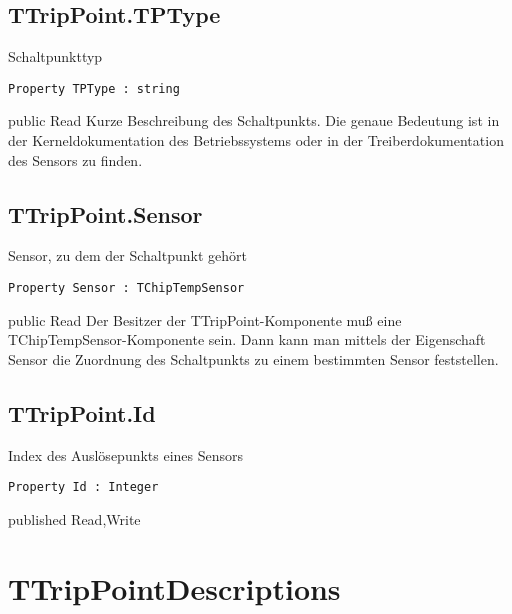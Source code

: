 \subsection{TTripPoint.TPType}
\label{computer:chiptemp:ttrippoint:tptype}
\begin{FPCList}
\Synopsis
Schaltpunkttyp\Declaration 

\begin{verbatim}
Property TPType : string
\end{verbatim}
\Visibility
public
\Access
Read
\Description
Kurze Beschreibung des Schaltpunkts. Die genaue Bedeutung ist in der Kerneldokumentation des Betriebssystems oder in der Treiberdokumentation des Sensors zu finden.\end{FPCList}
\subsection{TTripPoint.Sensor}
\label{computer:chiptemp:ttrippoint:sensor}
\begin{FPCList}
\Synopsis
Sensor, zu dem der Schaltpunkt gehört\Declaration 

\begin{verbatim}
Property Sensor : TChipTempSensor
\end{verbatim}
\Visibility
public
\Access
Read
\Description
Der Besitzer der TTripPoint-Komponente muß eine TChipTempSensor-Komponente sein. Dann kann man mittels der Eigenschaft Sensor die Zuordnung des Schaltpunkts zu einem bestimmten Sensor feststellen.\end{FPCList}
\subsection{TTripPoint.Id}
\label{computer:chiptemp:ttrippoint:id}
\begin{FPCList}
\Synopsis
Index des Auslösepunkts eines Sensors\Declaration 

\begin{verbatim}
Property Id : Integer
\end{verbatim}
\Visibility
published
\Access
Read,Write
\end{FPCList}
\section{TTripPointDescriptions}
\label{computer:chiptemp:ttrippointdescriptions}
